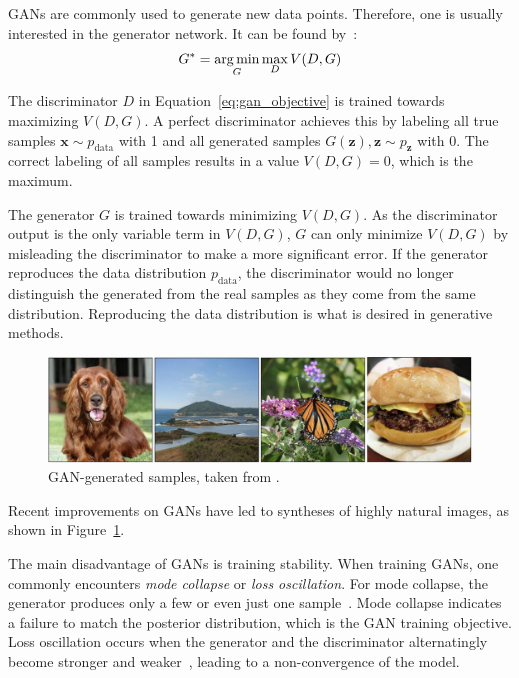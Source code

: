 \acp{GAN} are commonly used to generate new data points.
Therefore, one is usually interested in the generator network.
It can be found by~\citep{goodfellow2014gans}:
\begin{align}
    G^* = \operatorname*{arg\,min}_G \max_{D} V(D, G) \label{eq:gan_objective}
\end{align}

The discriminator $D$ in Equation~\ref{eq:gan_objective} is trained towards maximizing $V(D, G)$.
A perfect discriminator achieves this by labeling all true samples $\bm{x} \sim p_{\text{data}}$ with 1 and all generated samples $G(\bm{z}), \bm{z}\sim p_{\bm{z}}$ with 0.
The correct labeling of all samples results in a value $V(D, G) = 0$, which is the maximum.

The generator $G$ is trained towards minimizing $V(D, G)$.
As the discriminator output is the only variable term in $V(D, G)$, $G$ can only minimize $V(D, G)$ by misleading the discriminator to make a more significant error.
If the generator reproduces the data distribution $p_{\text{data}}$, the discriminator would no longer distinguish the generated from the real samples as they come from the same distribution.
Reproducing the data distribution is what is desired in generative methods.

\begin{figure}
    \centering
    \includegraphics[width=\textwidth]{images/gan_samples.png}
    \caption[GAN-generated samples]{GAN-generated samples, taken from \citet{brock2018large}.}
    \label{fig:gan_samples}
\end{figure}

Recent improvements on \acp{GAN} have led to syntheses of highly natural images, as shown in Figure~\ref{fig:gan_samples}.

The main disadvantage of \acp{GAN} is training stability.
When training \acp{GAN}, one commonly encounters \textit{mode collapse} or \textit{loss oscillation}.
For mode collapse, the generator produces only a few or even just one sample~\citep{che2016mode}.
Mode collapse indicates a failure to match the posterior distribution, which is the \ac{GAN} training objective.
Loss oscillation occurs when the generator and the discriminator alternatingly become stronger and weaker~\citep{ham2020unbalanced}, leading to a non-convergence of the model.

